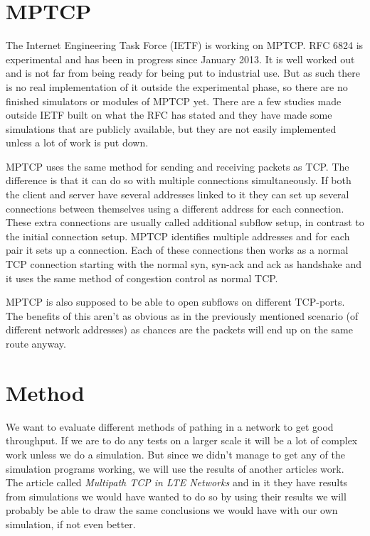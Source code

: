 \documentclass[11pt,twocolumn]{article}
\begin{document}
\section{MPTCP}
The Internet Engineering Task Force (IETF) is working on MPTCP. RFC 6824 is experimental and has been in progress since January 2013. It is well worked out and is not far from being ready for being put to industrial use. But as such there is no real implementation of it outside the experimental phase, so there are no finished simulators or modules of MPTCP yet. There are a few studies made outside IETF built on what the RFC has stated and they have made some simulations that are publicly available, but they are not easily implemented unless a lot of work is put down.

MPTCP uses the same method for sending and receiving packets as TCP. The difference is that it can do so with multiple connections simultaneously. If both the client and server have several addresses linked to it they can set up several connections between themselves using a different address for each connection. These extra connections are usually called additional subflow setup, in contrast to the initial connection setup. MPTCP identifies multiple addresses and for each pair it sets up a connection. Each of these connections then works as a normal TCP connection starting with the normal syn, syn-ack and ack as handshake and it uses the same method of congestion control as normal TCP.

MPTCP is also supposed to be able to open subflows on different TCP-ports. The benefits of this  aren't as obvious as in the previously mentioned scenario (of different network addresses) as chances are the packets will end up on the same route anyway. 

\section{Method}

We want to evaluate different methods of pathing in a network to get good throughput. If we are to do any tests on a larger scale it will be a lot of complex work unless we do a simulation. But since we didn't manage to get any of the simulation programs working, we will use the results of another articles work. The article called \emph{Multipath TCP in LTE Networks} and in it they have results from simulations we would have wanted to do so by using their results we will probably be able to draw the same conclusions we would have with our own simulation, if not even better.
\end{document}
